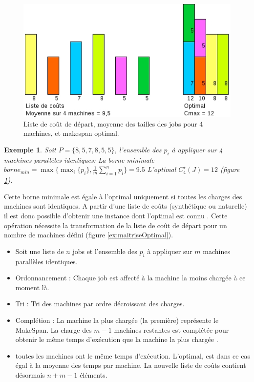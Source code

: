 \documentclass[a4paper,12pt]{report}
\theoremstyle{plain}				%
\newtheorem{example}{Exemple}
\theoremstyle{definition}				%
\begin{document}
\begin{figure}
{\centering
\includegraphics[width=\columnwidth]{MoyenneVsOptimal.jpg}
\caption{Liste de coût de départ, moyenne des tailles des jobs pour 4 machines, et makespan optimal.}
\label{ex:borneMinVSOptimalListeDepart}
\par}
\end{figure}

\begin{example}
Soit $P=\{8, 5, 7, 8, 5, 5\}$, l'ensemble des $p_i$ à appliquer sur 4 machines parallèles identiques:
La borne minimale $borne_{min} = \max \{ \max_i\{p_i\}, \frac{1}{m} \sum_{i=1}^{n} p_i \} = 9.5$ 
L'optimal $C_4^\star(J) = 12$ (figure \ref{ex:borneMinVSOptimalListeDepart}).
\end{example}

Cette borne minimale est égale à l'optimal uniquement si toutes les charges des machines sont identiques.
A partir d'une liste de coûts (synthétique ou naturelle) il est donc possible d'obtenir une instance dont l'optimal est connu \cite{benoit2021update}. Cette opération nécessite la transformation de la liste de coût de départ pour un 
  nombre de machines défini (figure \ref{ex:maitriseOptimal}).
\begin{itemize}
	\item Soit une liste de $n$ jobs et l'ensemble des $p_i$ à appliquer sur $m$ machines parallèles identiques.
	\item Ordonnancement : Chaque job est affecté à la machine la moins chargée à ce moment là. 
	\item Tri : Tri des machines par ordre décroissant des charges.
	\item Complétion : La machine la plus chargée (la première) représente le MakeSpan. 
	      La charge des $m-1$ machines restantes est complétée pour obtenir le même temps d'exécution que la machine la plus 	          chargée .
	\item toutes les machines ont le même temps d'exécution. L'optimal, est dans ce cas égal à la 
	      moyenne des temps par machine. 
	      La nouvelle liste de coûts contient désormais $n + m-1$ éléments.
\end{itemize}
\end{document}
